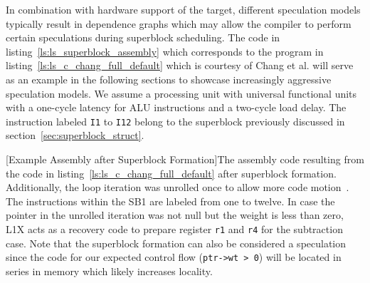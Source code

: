  In combination with hardware support of the target, different speculation models typically result in dependence graphs which may allow the compiler to perform certain speculations during superblock scheduling. The code in listing~\ref{ls:ls_superblock_assembly} which corresponds to the program in listing~\ref{ls:ls_c_chang_full_default} which is courtesy of Chang et al. will serve as an example in the following sections to showcase increasingly aggressive speculation models. We assume a processing unit with universal functional units with a one-cycle latency for ALU instructions and a two-cycle load delay. The instruction labeled \texttt{I1} to \texttt{I12} belong to the superblock previously discussed in section~\ref{sec:superblock_struct}.
\begin{center}
        
        \captionsetup{type=listing}
        [Example Assembly after Superblock Formation]{The assembly code resulting from the code in listing~\ref{ls:ls_c_chang_full_default} after superblock formation. Additionally, the loop iteration was unrolled once to allow more code motion~\cite{chang95}. The instructions within the SB1 are labeled from one to twelve. In case the pointer in the unrolled iteration was not null but the weight is less than zero, L1X acts as a recovery code to prepare register \texttt{r1} and \texttt{r4} for the subtraction case. Note that the superblock formation can also be considered a speculation since the code for our expected control flow (\texttt{ptr->wt > 0}) will be located in series in memory which likely increases locality.}
        \label{ls:ls_superblock_assembly}
\end{center}

